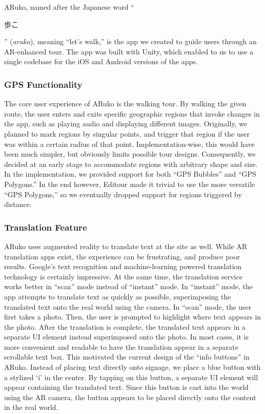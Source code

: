 \documentclass[a4paper, 10pt, american, titlepage]{article}
\begin{document}
ARuko, named after the Japanese word ``\begin{CJK}{UTF8}{min}歩こ\end{CJK}''
(\textit{aruko}), meaning ``let's walk,'' is the app we created to guide users
through an AR-enhanced tour. The app was built with Unity, which enabled to us
to use a single codebase for the iOS and Android versions of the apps.

\subsubsection{GPS Functionality}
\label{sec:gpsFunctionality}

The core user experience of ARuko is the walking tour. By walking the given
route, the user enters and exits specific geographic regions that invoke
changes in the app, such as playing audio and displaying different images.
Originally, we planned to mark regions by singular points, and trigger that
region if the user was within a certain radius of that point.
Implementation-wise, this would have been much simpler, but obviously limits
possible tour designs. Consequently, we decided at an early stage to
accommodate regions with arbitrary shape and size.  In the implementation, we
provided support for both ``GPS Bubbles'' and ``GPS Polygons.'' In the end
however, Editour made it trivial to use the more versatile ``GPS Polygons,'' so
we eventually dropped support for regions triggered by distance.

\subsubsection{Translation Feature}
\label{sec:translationFeature}

ARuko uses augmented reality to translate text at the site as well. While AR
translation apps exist, the experience can be frustrating, and produce poor
results. Google's text recognition and machine-learning powered translation
technology is certainly impressive. At the same time, the translation service
works better in ``scan'' mode instead of ``instant'' mode. In ``instant'' mode,
the app attempts to translate text as quickly as possible, superimposing the
translated text onto the real world using the camera. %
In ``scan'' mode, the user first takes a photo. Then, the user is prompted to 
highlight where text appears in the photo. %
After the translation is complete, the translated text appears in a separate UI %
element instead superimposed onto the photo. In most cases, it is more 
convenient and readable to have the translation appear in a separate scrollable
text box. This motivated the current design of the ``info buttons'' in ARuko. 
Instead of placing text directly onto signage, we place a blue button with a 
stylized `i' in the center. By tapping on this button, a separate UI element 
will appear containing the translated text. Since this button is cast into the %
world using the AR camera, the button appears to be placed directly onto the 
content in the real world.
\end{document}
